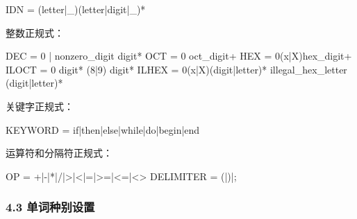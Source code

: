 \documentclass[
  a4paper,
  fontset=none,
]{ctexart}
\newenvironment{Shaded}{}{}
\newcommand{\NormalTok}[1]{#1}
\begin{document}
\begin{Shaded}
\begin{Highlighting}[]
\NormalTok{IDN = (letter|\_)(letter|digit|\_)*}
\end{Highlighting}
\end{Shaded}

整数正规式：

\begin{Shaded}
\begin{Highlighting}[]
\NormalTok{DEC   = 0 | nonzero\_digit digit*}
\NormalTok{OCT   = 0 oct\_digit+}
\NormalTok{HEX   = 0(x|X)hex\_digit+}
\NormalTok{ILOCT = 0 digit* (8|9) digit*}
\NormalTok{ILHEX = 0(x|X)(digit|letter)* illegal\_hex\_letter (digit|letter)*}
\end{Highlighting}
\end{Shaded}

关键字正规式：

\begin{Shaded}
\begin{Highlighting}[]
\NormalTok{KEYWORD = if|then|else|while|do|begin|end}
\end{Highlighting}
\end{Shaded}

运算符和分隔符正规式：

\begin{Shaded}
\begin{Highlighting}[]
\NormalTok{OP        = +|{-}|*|/|\textgreater{}|\textless{}|=|\textgreater{}=|\textless{}=|\textless{}\textgreater{}}
\NormalTok{DELIMITER = (|)|;}
\end{Highlighting}
\end{Shaded}

\hypertarget{ux5355ux8bcdux79cdux522bux8bbeux7f6e}{%
\subsubsection{4.3
单词种别设置}\label{ux5355ux8bcdux79cdux522bux8bbeux7f6e}}
\end{document}
